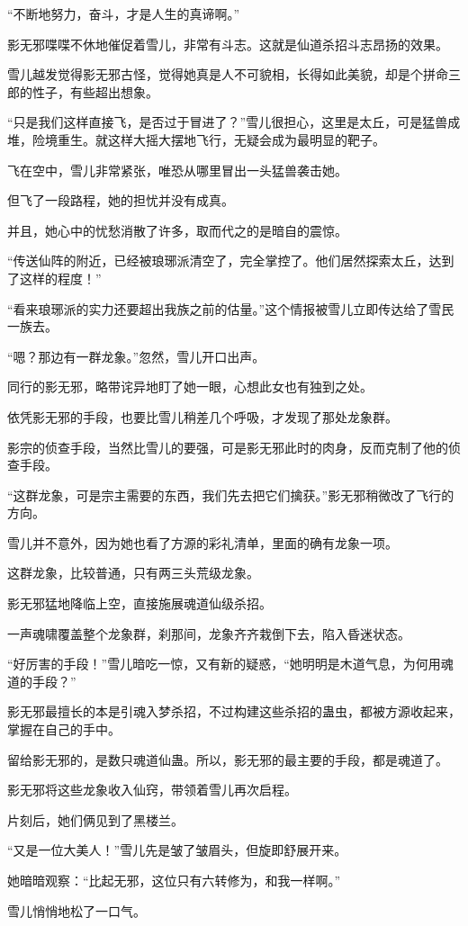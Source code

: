 \begin{this_body}
“不断地努力，奋斗，才是人生的真谛啊。”

影无邪喋喋不休地催促着雪儿，非常有斗志。这就是仙道杀招斗志昂扬的效果。

雪儿越发觉得影无邪古怪，觉得她真是人不可貌相，长得如此美貌，却是个拼命三郎的性子，有些超出想象。

“只是我们这样直接飞，是否过于冒进了？”雪儿很担心，这里是太丘，可是猛兽成堆，险境重生。就这样大摇大摆地飞行，无疑会成为最明显的靶子。

飞在空中，雪儿非常紧张，唯恐从哪里冒出一头猛兽袭击她。

但飞了一段路程，她的担忧并没有成真。

并且，她心中的忧愁消散了许多，取而代之的是暗自的震惊。

“传送仙阵的附近，已经被琅琊派清空了，完全掌控了。他们居然探索太丘，达到了这样的程度！”

“看来琅琊派的实力还要超出我族之前的估量。”这个情报被雪儿立即传达给了雪民一族去。

“嗯？那边有一群龙象。”忽然，雪儿开口出声。

同行的影无邪，略带诧异地盯了她一眼，心想此女也有独到之处。

依凭影无邪的手段，也要比雪儿稍差几个呼吸，才发现了那处龙象群。

影宗的侦查手段，当然比雪儿的要强，可是影无邪此时的肉身，反而克制了他的侦查手段。

“这群龙象，可是宗主需要的东西，我们先去把它们擒获。”影无邪稍微改了飞行的方向。

雪儿并不意外，因为她也看了方源的彩礼清单，里面的确有龙象一项。

这群龙象，比较普通，只有两三头荒级龙象。

影无邪猛地降临上空，直接施展魂道仙级杀招。

一声魂啸覆盖整个龙象群，刹那间，龙象齐齐栽倒下去，陷入昏迷状态。

“好厉害的手段！”雪儿暗吃一惊，又有新的疑惑，“她明明是木道气息，为何用魂道的手段？”

影无邪最擅长的本是引魂入梦杀招，不过构建这些杀招的蛊虫，都被方源收起来，掌握在自己的手中。

留给影无邪的，是数只魂道仙蛊。所以，影无邪的最主要的手段，都是魂道了。

影无邪将这些龙象收入仙窍，带领着雪儿再次启程。

片刻后，她们俩见到了黑楼兰。

“又是一位大美人！”雪儿先是皱了皱眉头，但旋即舒展开来。

她暗暗观察：“比起无邪，这位只有六转修为，和我一样啊。”

雪儿悄悄地松了一口气。

\end{this_body}

